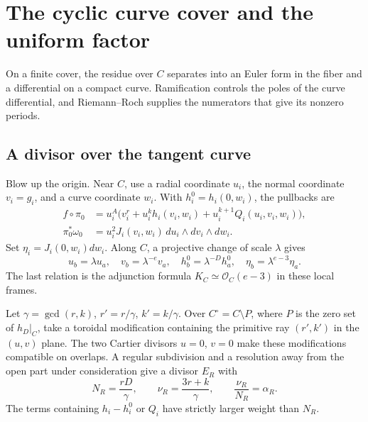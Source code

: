\documentclass[11pt]{article}
\numberwithin{equation}{section}
\theoremstyle{definition}
\theoremstyle{remark}
\newcommand{\OO}{\mathcal O}
\newcommand{\omegao}{\omega_0}
\begin{document}
\section{The cyclic curve cover and the uniform factor}
\label{sec:uniform}

On a finite cover, the residue over $C$ separates into an
Euler form in the fiber and a differential on a compact
curve. Ramification controls the poles of the curve
differential, and Riemann--Roch supplies the numerators
that give its nonzero periods.

\subsection{A divisor over the tangent curve}

Blow up the origin. Near $C$, use a radial coordinate $u_i$,
the normal coordinate $v_i=g_i$, and a curve coordinate
$w_i$. With $h_i^0=h_i(0,w_i)$, the pullbacks are
\begin{equation}\label{eq:first-blowup}
 \begin{split}
 f\circ\pi_0
   &=u_i^A\bigl(v_i^r+u_i^kh_i(v_i,w_i)
                      +u_i^{k+1}Q_i(u_i,v_i,w_i)\bigr),\\
 \pi_0^*\omegao
   &=u_i^2J_i(v_i,w_i)\,du_i\wedge dv_i\wedge dw_i.
 \end{split}
\end{equation}
Set $\eta_i=J_i(0,w_i)dw_i$. Along $C$, a projective
change of scale $\lambda$ gives
\begin{equation}\label{eq:curve-transitions}
 u_b=\lambda u_a,\quad v_b=\lambda^{-e}v_a,\quad
 h_b^0=\lambda^{-D}h_a^0,\quad
 \eta_b=\lambda^{e-3}\eta_a.
\end{equation}
The last relation is the adjunction formula
$K_C\simeq\OO_C(e-3)$ in these local frames.

Let $\gamma=\gcd(r,k)$, $r'=r/\gamma$, $k'=k/\gamma$.
Over $C^\circ=C\setminus P$, where $P$ is the zero set of
$h_D|_C$, take a toroidal modification containing the
primitive ray $(r',k')$ in the $(u,v)$ plane. The two
Cartier divisors $u=0$, $v=0$ make these modifications
compatible on overlaps. A regular subdivision and a
resolution away from the open part under consideration
give a divisor $E_R$ with
\begin{equation}\label{eq:R-numerics}
 N_R=\frac{rD}{\gamma},\qquad
 \nu_R=\frac{3r+k}{\gamma},\qquad
 \frac{\nu_R}{N_R}=\alpha_R.
\end{equation}
The terms containing $h_i-h_i^0$ or $Q_i$ have strictly
larger weight than $N_R$.
\end{document}
